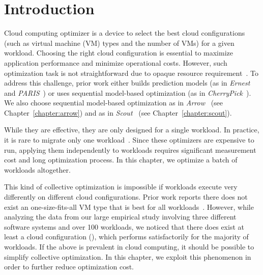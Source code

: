 \section{Introduction}
\label{sec:micky:introduction}

Cloud computing optimizer is a device to select the best cloud configurations
(such as virtual machine (VM) types and the number of VMs)
for a given workload.
Choosing the right cloud configuration is essential to maximize application performance and minimize operational costs. However, such optimization task is not straightforward due to opaque resource requirement~\cite{Yadwadkar2017,Hsu2016}.
To address this challenge, prior work either
builds prediction models (as in \emph{Ernest}~\cite{Venkataraman2016} and \emph{PARIS}~\cite{Yadwadkar2017}) or
uses sequential model-based optimization (as in \emph{CherryPick}~\cite{Alipourfard2017}).
We also choose sequential model-based optimization
as in \emph{Arrow}~\cite{Hsu2018Arrow} (see Chapter~\ref{chapter:arrow}) and
as in \emph{Scout}~\cite{Hsu2018Scout} (see Chapter~\ref{chapter:scout}).


While they are effective, they are only designed for a single workload.
In practice, it is rare to migrate only one workload~\cite{khajeh2010cloud,sripanidkulchai2010clouds}.
Since these optimizers are expensive to run,
applying them independently to workloads requires
significant measurement cost and
long optimization process.
In this chapter, we optimize a batch of workloads altogether.

This kind of collective optimization is impossible if
workloads execute very differently on different cloud configurations.
Prior work reports there does not exist an one-size-fits-all VM type that is best for all workloads~\cite{Alipourfard2017, Yadwadkar2017, Hsu2018Arrow}.
However, while analyzing the data from our large empirical study involving three different software systems and over 100 workloads, we noticed that there does exist at least a cloud configuration (), which performs satisfactorily
for the majority of workloads.
If the above is prevalent in cloud computing,
it should be possible to simplify collective optimization.
In this chapter, we exploit this phenomenon in order to further reduce optimization cost.


